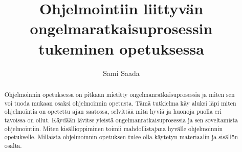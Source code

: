 \documentclass{tktltiki}
\author{Sami Saada}
\title{Ohjelmointiin liittyvän ongelmaratkaisuprosessin tukeminen opetuksessa}
\begin{document}
\maketitle

\doublespacing

\begin{abstract}
Ohjelmoinnin opetuksessa on pitkään mietitty ongelmanratkaisuprosessia ja miten
sen voi tuoda mukaan osaksi ohjelmoinnin opetusta. Tämä tutkielma käy aluksi
läpi miten ohjelmointia on opetettu ajan saatossa, selvittää mitä hyviä ja
huonoja puolia eri tavoissa on ollut. Käydään lävitse yleistä
ongelmanratkaisuprosessia ja sen soveltamista ohjelmointiin. Miten
kisällioppiminen toimii mahdollistajana hyvälle ohjelmoinnin opetukselle.
Millaista ohjelmoinnin opetuksen tulee olla käytetyn materiaalin ja sisällön
osalta.
\end{abstract}

\mytableofcontents










\lastpage
\end{document}
